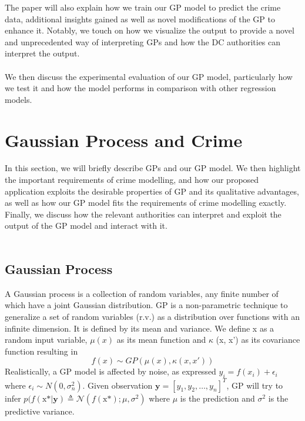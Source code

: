 \documentclass[letterpaper]{article}
\begin{document}
	The paper will also explain how we train our GP model to predict the crime data, additional insights gained as well as novel modifications of the GP to enhance it. 
	Notably, we touch on how we visualize the output to provide a novel and unprecedented way of interpreting GPs and how the DC authorities can interpret the output.\\ \\

	We then discuss the experimental evaluation of our GP model, particularly how we test it and how the model performs in comparison with other regression models. 
	
	\section{Gaussian Process and Crime}

	In this section, we will briefly describe GPs and our GP model. We then highlight the important requirements of crime modelling, and how our proposed application exploits the desirable properties of GP and its qualitative advantages, as well as how our GP model fits the requirements of crime modelling exactly. 
	Finally, we discuss how the relevant authorities can interpret and exploit the output of the GP model and interact with it.\\ \\

	\subsection{Gaussian Process}
	
	A Gaussian process is a collection of random variables, any finite number of which have a joint Gaussian distribution.
	GP is a non-parametric technique to generalize a set of random variables (r.v.) as a distribution over functions with an infinite dimension. \autocite{1}
	It is defined by its mean and variance. We define x as a random input variable, $\mu (x)$ as its mean function and $\kappa$ (x, x') as its covariance function resulting in \[f(x) \sim GP(\mu (x), \kappa (x, x')) \]
	Realistically, a GP model is affected by noise, as expressed $y_i = f(x_i) + \epsilon_i$ where $\epsilon_i \sim N(0, \sigma^2_n)$.
	Given observation $\mathbf{y} = [y_1, y_2, \ldots, y_n]^T$, GP will try to infer  $ p(f(\text{x*} | \textbf{y}) \triangleq \mathcal{N}(f(\text{x*}); \mu, \sigma^2)$ where $\mu$ is the prediction and $\sigma^2$ is the predictive variance. 
	
\end{document}
